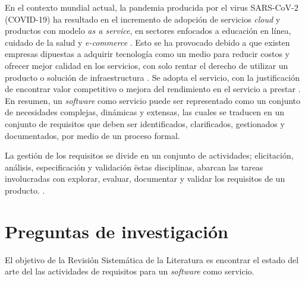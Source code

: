 \documentclass{article}
\begin{document}
En el contexto mundial actual, la pandemia producida por el virus SARS-CoV-2 (COVID-19) ha resultado en el incremento de  adopción de servicios \emph{cloud} y 
productos con modelo \emph{as a service}, en sectores enfocados a educación en línea, cuidado de la salud y \emph{e-commerce} \cite{value:online} .
Esto se ha provocado debido a que existen empresas dipuestas a adquirir tecnología como un medio para reducir costos y ofrecer mejor calidad en los
servicios, con solo rentar el derecho de utilizar un producto o solución de infraestructura \cite{Wu2011}.
Se adopta el servicio, con la justificación de encontrar valor competitivo o mejora del rendimiento en el servicio a prestar \cite{oliveira20191}.
En resumen, un \emph{software} como servicio puede ser representado como un conjunto de necesidades complejas, dinámicas y extensas, 
las cuales se traducen en un conjunto de requisitos que deben ser identificados, clarificados, 
gestionados y documentados, por medio de un proceso formal. 

La gestión de los requisitos se divide en un conjunto de actividades; elicitación, análisis, especificación y validación \cite{abran2004software}
ëstas disciplinas, abarcan las tareas involucradas con explorar, evaluar, documentar y validar los requisitos de un producto. \cite[p.15]{2543993}.








\newpage

\section{Preguntas de investigación}\label{pi}
El objetivo de la Revisión Sistemática de la Literatura es encontrar el estado del arte del las actividades de requisitos para un \emph{software} como servicio. 
\end{document}
